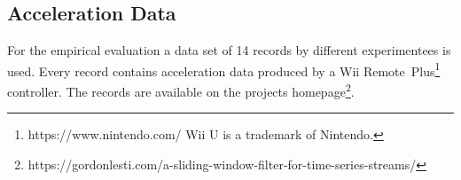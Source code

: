 \subsection{Acceleration Data} \label{acceleration_data}

For the empirical evaluation a data set of 14 records by different experimentees is used. Every record contains
acceleration data produced by a Wii
Remote\texttrademark~Plus\footnote{https://www.nintendo.com/ Wii U is a trademark of Nintendo.} controller. The records
are available on the projects homepage\footnote{https://gordonlesti.com/a-sliding-window-filter-for-time-series-streams/}.
